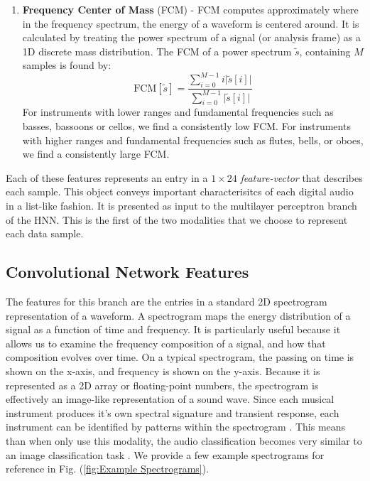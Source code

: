 \documentclass[conference,onecolumn,letterpaper]{IEEEtran}
\begin{document}
\begin{enumerate}
\item\textbf{Frequency Center of Mass} (FCM) - 
FCM computes approximately where in the frequency spectrum, the energy of a waveform is centered around. It is calculated by treating the power spectrum of a signal (or analysis frame) as a 1D discrete mass distribution. The FCM of a power spectrum $\widetilde{s}$, containing $M$ samples is found by:
\begin{equation}
    \label{eqn:FCM}
    \text{FCM}[\widetilde{s}] = 
    \frac{\sum_{i=0}^{M-1}i\big|\widetilde{s}[i]\big|}
    {\sum_{i=0}^{M-1}\big|\widetilde{s}[i]\big|}
\end{equation}
For instruments with lower ranges and fundamental frequencies such as basses, bassoons or cellos, we find a consistently low FCM. For instruments with higher ranges and fundamental frequencies such as flutes, bells, or oboes, we find a consistently large FCM.

\end{enumerate}

Each of these features represents an entry in a $1 \times 24$ \textit{feature-vector} that describes each sample. This object conveys important characterisitcs of each digital audio in a list-like fashion. It is presented as input to the multilayer perceptron branch of the HNN. This is the first of the two modalities that we choose to represent each data sample.


\subsection{Convolutional Network Features}
\label{subsec:FeaturesCNN}

The features for this branch are the entries in a standard 2D spectrogram representation of a waveform. A spectrogram maps the energy distribution of a signal as a function of time and frequency. It is particularly useful because it allows us to examine the frequency composition of a signal, and how that composition evolves over time. On a typical spectrogram, the passing on time is shown on the x-axis, and frequency is shown on the y-axis. Because it is represented as a 2D array or floating-point numbers, the spectrogram is effectively an image-like representation of a sound wave. Since each musical instrument produces it's own spectral signature and transient response, each instrument can be identified by patterns within the spectrogram \cite{Virtanen}. This means than when only use this modality, the audio classification becomes very similar to an image classification task \cite{Ngiam}. We provide a few example spectrograms for reference in Fig. (\ref{fig:Example Spectrograms}).
\end{document}
